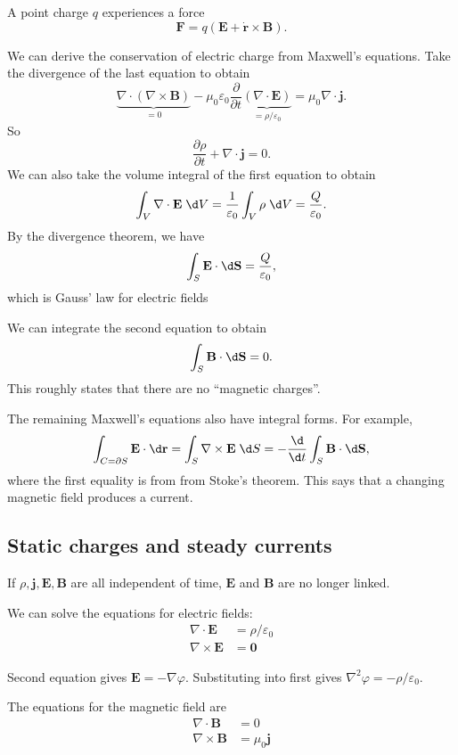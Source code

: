 \documentclass[a4paper]{article}
\begin{document}
\begin{law}
  A point charge $q$ experiences a force
  \[
    \mathbf{F} = q(\mathbf{E} + \dot{\mathbf{r}} \times \mathbf{B}).
  \]
\end{law}

We can derive the conservation of electric charge from Maxwell's equations. Take the divergence of the last equation to obtain
\[
  \underbrace{\nabla\cdot (\nabla\times \mathbf{B})}_{=0} - \mu_0\varepsilon_0\frac{\partial}{\partial t} \underbrace{(\nabla\cdot \mathbf{E})}_{=\rho/\varepsilon_0} = \mu_0 \nabla\cdot \mathbf{j}.
\]
So
\[
  \frac{\partial \rho}{\partial t} + \nabla\cdot \mathbf{j} = 0.
\]
We can also take the volume integral of the first equation to obtain
\[
  \int_V\nabla\cdot \mathbf{E}\;\d V = \frac{1}{\varepsilon_0} \int_V \rho\;\d V = \frac{Q}{\varepsilon_0}.
\]
By the divergence theorem, we have
\[
  \int_S \mathbf{E}\cdot \d \mathbf{S} = \frac{Q}{\varepsilon_0},
\]
which is Gauss' law for electric fields

We can integrate the second equation to obtain
\[
  \int_S \mathbf{B}\cdot \d \mathbf{S} = 0.
\]
This roughly states that there are no ``magnetic charges''.

The remaining Maxwell's equations also have integral forms. For example,
\[
  \int_{C = \partial S} \mathbf{E}\cdot \d \mathbf{r} = \int_S \nabla \times \mathbf{E}\;\d S = -\frac{\d }{\d t}\int_S \mathbf{B}\cdot \d \mathbf{S},
\]
where the first equality is from from Stoke's theorem. This says that a changing magnetic field produces a current.

\subsection{Static charges and steady currents}
If $\rho, \mathbf{j}, \mathbf{E}, \mathbf{B}$ are all independent of time, $\mathbf{E}$ and $\mathbf{B}$ are no longer linked.

We can solve the equations for electric fields:
\begin{align*}
  \nabla\cdot \mathbf{E} &= \rho/\varepsilon_0\\
  \nabla\times \mathbf{E} &= \mathbf{0}
\end{align*}

Second equation gives $\mathbf{E} = -\nabla \varphi$. Substituting into first gives $\nabla^2 \varphi = -\rho/\varepsilon_0$.

The equations for the magnetic field are 
\begin{align*}
  \nabla\cdot \mathbf{B} &= 0\\
  \nabla\times \mathbf{B} &= \mu_0 \mathbf{j}
\end{align*}
\end{document}
